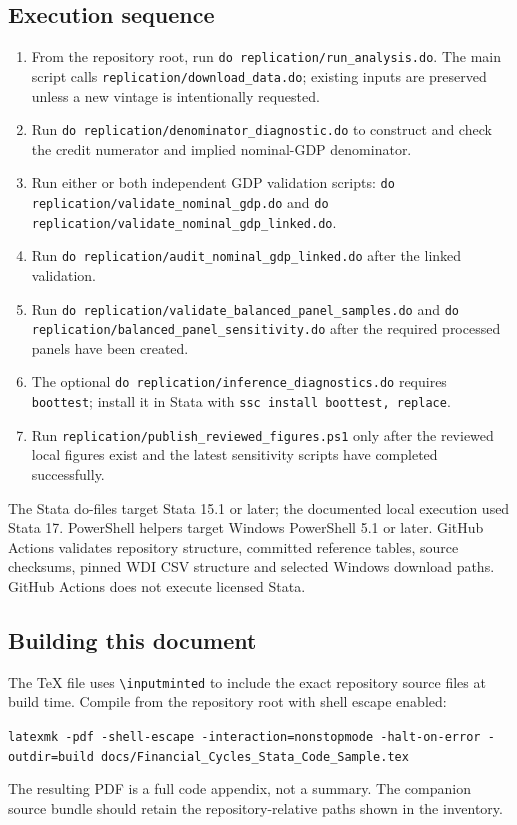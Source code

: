\documentclass[10pt]{article}
\begin{document}
\subsection*{Execution sequence}
\begin{enumerate}
\item From the repository root, run \texttt{do replication/run\_analysis.do}. The main script calls \texttt{replication/download\_data.do}; existing inputs are preserved unless a new vintage is intentionally requested.
\item Run \texttt{do replication/denominator\_diagnostic.do} to construct and check the credit numerator and implied nominal-GDP denominator.
\item Run either or both independent GDP validation scripts: \texttt{do replication/validate\_nominal\_gdp.do} and \texttt{do replication/validate\_nominal\_gdp\_linked.do}.
\item Run \texttt{do replication/audit\_nominal\_gdp\_linked.do} after the linked validation.
\item Run \texttt{do replication/validate\_balanced\_panel\_samples.do} and \texttt{do replication/balanced\_panel\_sensitivity.do} after the required processed panels have been created.
\item The optional \texttt{do replication/inference\_diagnostics.do} requires \texttt{boottest}; install it in Stata with \texttt{ssc install boottest, replace}.
\item Run \texttt{replication/publish\_reviewed\_figures.ps1} only after the reviewed local figures exist and the latest sensitivity scripts have completed successfully.
\end{enumerate}

The Stata do-files target Stata 15.1 or later; the documented local execution used Stata 17. PowerShell helpers target Windows PowerShell 5.1 or later. GitHub Actions validates repository structure, committed reference tables, source checksums, pinned WDI CSV structure and selected Windows download paths. GitHub Actions does not execute licensed Stata.

\subsection*{Building this document}
The TeX file uses \texttt{\textbackslash inputminted} to include the exact repository source files at build time. Compile from the repository root with shell escape enabled:
\begin{center}
\texttt{latexmk -pdf -shell-escape -interaction=nonstopmode -halt-on-error -outdir=build docs/Financial\_Cycles\_Stata\_Code\_Sample.tex}
\end{center}
The resulting PDF is a full code appendix, not a summary. The companion source bundle should retain the repository-relative paths shown in the inventory.
\end{document}
